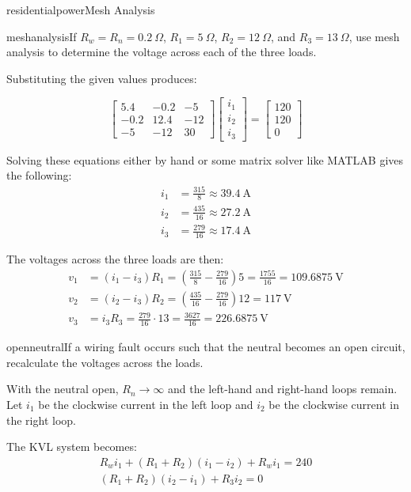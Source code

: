 \begin{mainquestion}{residentialpower}{Mesh Analysis}
\begin{partquestion}{meshanalysis}{If $R_{w}=R_{n}=0.2~\Omega$, $R_{1}=5~\Omega$, $R_{2}=12~\Omega$, and $R_{3}=13~\Omega$, use mesh analysis to determine the voltage across each of the three loads.}
\begin{answer}
Substituting the given values produces:

\[
\begin{bmatrix}
5.4 & -0.2 & -5 \\
-0.2 & 12.4 & -12 \\
-5 & -12 & 30
\end{bmatrix}
\begin{bmatrix}
i_1 \\
i_2 \\
i_3
\end{bmatrix}
=
\begin{bmatrix}
120 \\
120 \\
0
\end{bmatrix}
\]

Solving these equations either by hand or some matrix solver like MATLAB gives the following:
\begin{align*}
    i_1 &= \frac{315}{8} \approx \qty{39.4}{\ampere}\\
    i_2 &= \frac{435}{16} \approx \qty{27.2}{\ampere}\\
    i_3 &= \frac{279}{16} \approx \qty{17.4}{\ampere}
\end{align*}

The voltages across the three loads are then:
\begin{align*}
v_{1} &= (i_{1}-i_{3}) R_{1} = \left( \frac{315}{8} - \frac{279}{16} \right) 5 = \frac{1755}{16} = 109.6875~\text{V} \\
v_{2} &= (i_{2}-i_{3}) R_{2} = \left( \frac{435}{16} - \frac{279}{16} \right) 12 = 117~\text{V} \\
v_{3} &= i_{3} R_{3} = \frac{279}{16} \cdot 13 = \frac{3627}{16} = 226.6875~\text{V}
\end{align*}
\end{answer}
\end{partquestion}

\begin{partquestion}{openneutral}{If a wiring fault occurs such that the neutral becomes an open circuit, recalculate the voltages across the loads.}
\begin{answer}
With the neutral open, $R_{n}\to\infty$ and the left-hand and right-hand loops remain. Let $i_{1}$ be the clockwise current in the left loop and $i_{2}$ be the clockwise current in the right loop.

The KVL system becomes:
\begin{gather*}
R_wi_1 + (R_1 + R_2)(i_1 - i_2) + R_wi_1 = 240 \\
(R_1 + R_2)(i_2 - i_1) + R_3i_2 = 0
\end{gather*}


\end{answer}
\end{partquestion}
\end{mainquestion}
